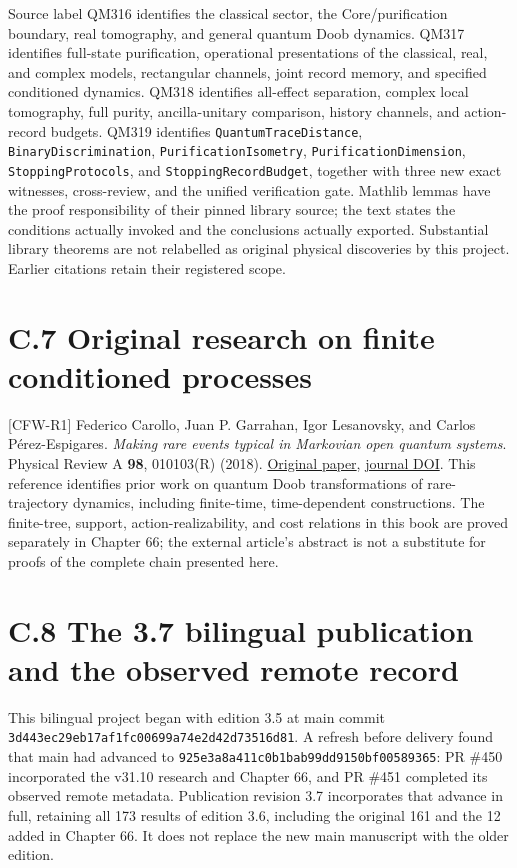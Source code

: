 \documentclass[
  11pt,
  oneside]{book}
\begin{document}
Source label QM316 identifies the classical sector, the
Core/purification boundary, real tomography, and general quantum Doob
dynamics. QM317 identifies full-state purification, operational
presentations of the classical, real, and complex models, rectangular
channels, joint record memory, and specified conditioned dynamics. QM318
identifies all-effect separation, complex local tomography, full purity,
ancilla-unitary comparison, history channels, and action-record budgets.
QM319 identifies \texttt{Quantum\allowbreak Trace\allowbreak Distance},
\texttt{Binary\allowbreak Discrimination}, \texttt{Purification\allowbreak Isometry},
\texttt{Purification\allowbreak Dimension}, \texttt{Stopping\allowbreak Protocols}, and
\texttt{Stopping\allowbreak Record\allowbreak Budget}, together with three new exact witnesses,
cross-review, and the unified verification gate. Mathlib lemmas have the
proof responsibility of their pinned library source; the text states the
conditions actually invoked and the conclusions actually exported.
Substantial library theorems are not relabelled as original physical
discoveries by this project. Earlier citations retain their registered
scope.

\section{C.7 Original research on finite conditioned processes}

{[}CFW-R1{]} Federico Carollo, Juan P. Garrahan, Igor Lesanovsky, and
Carlos Pérez-Espigares. \emph{Making rare events typical in Markovian
open quantum systems}. Physical Review A \textbf{98}, 010103(R) (2018).
\href{https://arxiv.org/abs/1711.10951}{Original paper},
\href{https://doi.org/10.1103/PhysRevA.98.010103}{journal DOI}. This
reference identifies prior work on quantum Doob transformations of
rare-trajectory dynamics, including finite-time, time-dependent
constructions. The finite-tree, support, action-realizability, and cost
relations in this book are proved separately in Chapter 66; the external
article's abstract is not a substitute for proofs of the complete chain
presented here.

\section{C.8 The 3.7 bilingual publication and the observed remote
record}

This bilingual project began with edition 3.5 at main commit
\texttt{3d443ec29eb1\allowbreak 7af1fc00699a\allowbreak 74e2d42d7351\allowbreak 6d81}. A refresh before
delivery found that main had advanced to
\texttt{925e3a8a411c\allowbreak 0b1bab99dd91\allowbreak 50bf00589365}: PR \#450 incorporated
the v31.10 research and Chapter 66, and PR \#451 completed its observed
remote metadata. Publication revision 3.7 incorporates that advance in
full, retaining all 173 results of edition 3.6, including the original
161 and the 12 added in Chapter 66. It does not replace the new main
manuscript with the older edition.
\end{document}

